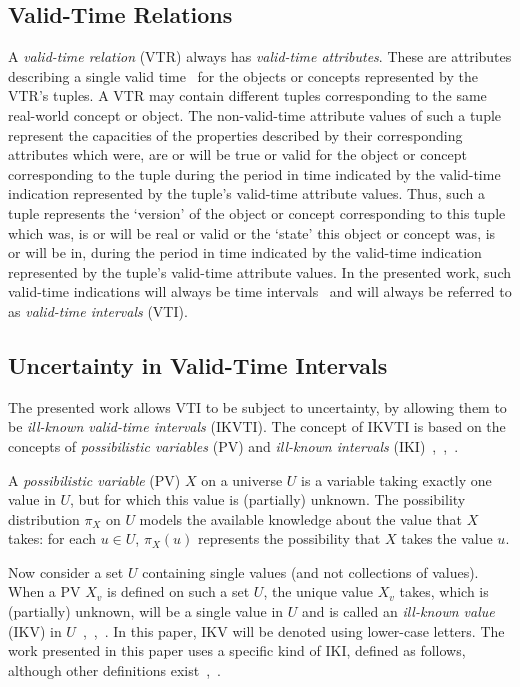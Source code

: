 \documentclass[runningheads,a4paper]{llncs}
\begin{document}
\subsection{Valid-Time Relations}
A \emph{valid-time relation} (VTR) always has \emph{valid-time attributes}. These are attributes describing a single valid time~\cite{Bohlen1998lncs} for the objects or concepts represented by the VTR's tuples. A VTR may contain different tuples corresponding to the same real-world concept or object. The non-valid-time attribute values of such a tuple represent the capacities of the properties described by their corresponding attributes which were, are or will be true or valid for the object or concept corresponding to the tuple during the period in time indicated by the valid-time indication represented by the tuple's valid-time attribute values. Thus, such a tuple represents the `version' of the object or concept corresponding to this tuple which was, is or will be real or valid or the `state' this object or concept was, is or will be in, during the period in time indicated by the valid-time indication represented by the tuple's valid-time attribute values. In the presented work, such valid-time indications will always be time intervals~\cite{Bohlen1998lncs} and will always be referred to as \emph{valid-time intervals} (VTI).

\subsection{Uncertainty in Valid-Time Intervals}
The presented work allows VTI to be subject to uncertainty, by allowing them to be \emph{ill-known valid-time intervals} (IKVTI). The concept of IKVTI is based on the concepts of \emph{possibilistic variables} (PV) and \emph{ill-known intervals} (IKI)~\cite{Billiet2012ipmu},~\cite{Pons2013ijufkbs},~\cite{Dubois1988cma}.

\begin{definition}
\label{def:poss-variable}
A \emph{possibilistic variable} (PV) $X$ on a universe $U$ is a variable taking exactly one value in $U$, but for which this value is (partially) unknown. The possibility distribution $\pi_X$ on $U$ models the available knowledge about the value that $X$ takes: for each $u \in U$, $\pi_X(u)$ represents the possibility that $X$ takes the value $u$.
\end{definition}

Now consider a set $U$ containing single values (and not collections of values). When a PV $X_{v}$ is defined on such a set $U$, the unique value $X_{v}$ takes, which is (partially) unknown, will be a single value in $U$ and is called an \emph{ill-known value} (IKV) in $U$~\cite{Billiet2012ipmu},~\cite{Pons2013ijufkbs},~\cite{Dubois1988cma}. In this paper, IKV will be denoted using lower-case letters. The work presented in this paper uses a specific kind of IKI, defined as follows, although other definitions exist~\cite{Billiet2012ipmu},~\cite{Pons2012ipmu}.
\end{document}
